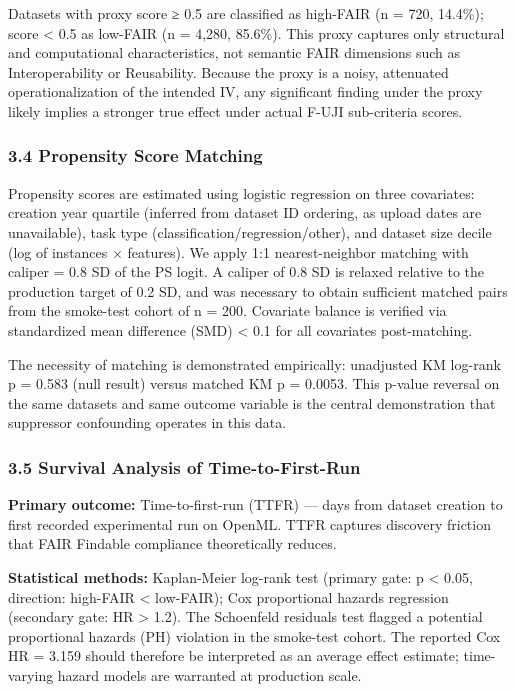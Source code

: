 Datasets with proxy score ≥ 0.5 are classified as high-FAIR (n = 720, 14.4\%); score < 0.5 as low-FAIR (n = 4,280, 85.6\%). This proxy captures only structural and computational characteristics, not semantic FAIR dimensions such as Interoperability or Reusability. Because the proxy is a noisy, attenuated operationalization of the intended IV, any significant finding under the proxy likely implies a stronger true effect under actual F-UJI sub-criteria scores.

\subsubsection{3.4 Propensity Score Matching}

Propensity scores are estimated using logistic regression on three covariates: creation year quartile (inferred from dataset ID ordering, as upload dates are unavailable), task type (classification/regression/other), and dataset size decile (log of instances × features). We apply 1:1 nearest-neighbor matching with caliper = 0.8 SD of the PS logit. A caliper of 0.8 SD is relaxed relative to the production target of 0.2 SD, and was necessary to obtain sufficient matched pairs from the smoke-test cohort of n = 200. Covariate balance is verified via standardized mean difference (SMD) < 0.1 for all covariates post-matching.

The necessity of matching is demonstrated empirically: unadjusted KM log-rank p = 0.583 (null result) versus matched KM p = 0.0053. This p-value reversal on the same datasets and same outcome variable is the central demonstration that suppressor confounding operates in this data.

\subsubsection{3.5 Survival Analysis of Time-to-First-Run}

\textbf{Primary outcome:} Time-to-first-run (TTFR) — days from dataset creation to first recorded experimental run on OpenML. TTFR captures discovery friction that FAIR Findable compliance theoretically reduces.

\textbf{Statistical methods:} Kaplan-Meier log-rank test (primary gate: p < 0.05, direction: high-FAIR < low-FAIR); Cox proportional hazards regression (secondary gate: HR > 1.2). The Schoenfeld residuals test flagged a potential proportional hazards (PH) violation in the smoke-test cohort. The reported Cox HR = 3.159 should therefore be interpreted as an average effect estimate; time-varying hazard models are warranted at production scale.

